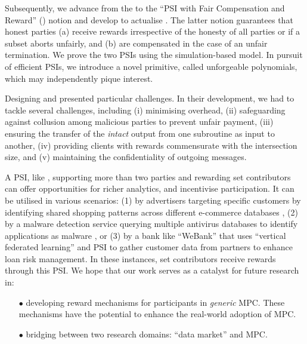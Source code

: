 Subsequently, we advance from the \p to the ``PSI with Fair Compensation and Reward'' (\ep) notion and develop \withRew to actualise \ep. The latter notion guarantees that honest parties (a) receive rewards irrespective of the honesty of all parties or if a subset aborts unfairly, and (b) are compensated in the case of an unfair termination. We prove the two PSIs using the simulation-based model. In pursuit of efficient PSIs, we introduce a novel primitive, called unforgeable polynomials, which may independently pique interest. 


Designing \withFai and \withRew presented particular challenges. In their development, we had to tackle several challenges, including (i) minimising overhead, (ii) safeguarding against collusion among malicious parties to prevent unfair payment, (iii) ensuring the transfer of the \textit{intact} output from one subroutine as input to another, (iv) providing clients with rewards commensurate with the intersection size, and (v) maintaining the confidentiality of outgoing messages.






A PSI, like \withRew, supporting more than two parties and rewarding set contributors can offer opportunities for richer analytics, and incentivise participation.  It can be utilised in various scenarios: (1) by advertisers targeting specific customers by identifying shared shopping patterns across different e-commerce databases \cite{IonKNPSS0SY20}, (2) by a malware detection service querying multiple antivirus databases to identify applications as malware \cite{TamrakarLPEPA17}, or (3) by a bank like ``WeBank'' \cite{ChengLCY20}  that uses  ``vertical federated learning''   and PSI to gather customer data from partners to enhance loan risk management. In these instances, set contributors receive rewards through this PSI. 
%
We hope that our work serves as a catalyst for future research in:


\vspace{-2mm}
 \begin{itemize}
 
 \item[$\bullet$] developing reward mechanisms for participants in \textit{generic} MPC. These mechanisms have the potential to enhance the real-world adoption of MPC. 

\item[$\bullet$] bridging between two research domains: ``data market'' \cite{golob2023decentralized,KochKMMR22,abs-2210-08723} and MPC. 

\end{itemize}

